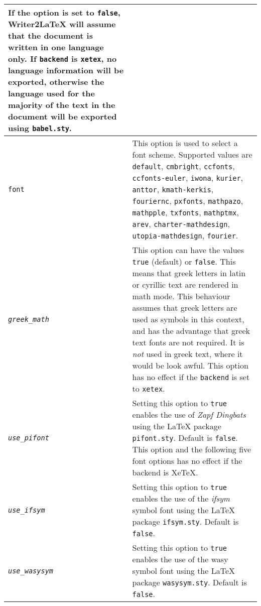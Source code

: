 \documentclass{article}
\newcommand\textstyleSourceText[1]{\texttt{\textmd{#1}}}
\begin{document}
\begin{center}
\begin{tabular}{|m{3.425cm}|m{13.188cm}|}
{\mdseries If the option is set to \textstyleSourceText{false}, Writer2LaTeX will assume that the document is written in one language only. If \textstyleSourceText{backend} is \textstyleSourceText{xetex}, no language information will be exported, otherwise the language used for the majority of the text in the document will be exported using \textstyleSourceText{babel.sty}.}\\\hline
\textstyleSourceText{font} &
This option is used to select a font scheme. Supported values are \textstyleSourceText{default}, \textstyleSourceText{cmbright}, \textstyleSourceText{ccfonts}, \textstyleSourceText{ccfonts-euler}, \textstyleSourceText{iwona}, \textstyleSourceText{kurier}, \textstyleSourceText{anttor}, \textstyleSourceText{kmath-kerkis}, \textstyleSourceText{fouriernc}, \textstyleSourceText{pxfonts}, \textstyleSourceText{mathpazo}, \textstyleSourceText{mathpple}, \textstyleSourceText{txfonts}, \textstyleSourceText{mathptmx}, \textstyleSourceText{arev}, \textstyleSourceText{charter-mathdesign}, \textstyleSourceText{utopia-mathdesign}, \textstyleSourceText{fourier}.\\\hline
{\mdseries \textstyleSourceText{\emph{greek\_math}}} &
{\mdseries This option can have the values \textstyleSourceText{true} (default) or \textstyleSourceText{false}. This means that greek letters in latin or cyrillic text are rendered in math mode. This behaviour assumes that greek letters are used as symbols in this context, and has the advantage that greek text fonts are not required. It is \emph{not} used in greek text, where it would be look awful. This option has no effect if the \textstyleSourceText{backend} is set to \textstyleSourceText{xetex}.}\\\hline
{\mdseries \textstyleSourceText{\emph{use\_pifont}}} &
{\mdseries Setting this option to \textstyleSourceText{true} enables the use of \emph{Zapf Dingbats} using the LaTeX package \textstyleSourceText{pifont.sty}. Default is \textstyleSourceText{false}.  This option and the following five font options has no effect if the backend is XeTeX.}\\\hline
{\mdseries \textstyleSourceText{\emph{use\_ifsym}}} &
{\mdseries Setting this option to \textstyleSourceText{true} enables the use of the \emph{ifsym} symbol font using the LaTeX package \textstyleSourceText{ifsym.sty}. Default is \textstyleSourceText{false}.}\\\hline
{\mdseries \textstyleSourceText{\emph{use\_wasysym}}} &
{\mdseries Setting this option to \textstyleSourceText{true} enables the use of the wasy symbol font using the LaTeX package \textstyleSourceText{wasysym.sty}. Default is \textstyleSourceText{false}.}\\\hline

\end{tabular}
\end{center}
\end{document}
